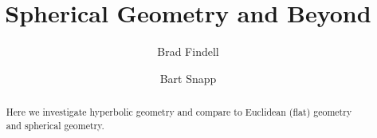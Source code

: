 \documentclass{ximera}
\title{Spherical Geometry and Beyond}
\author{Brad Findell \and Bart Snapp}
\begin{document}
\begin{abstract}
Here we investigate hyperbolic geometry and compare to Euclidean (flat) geometry and spherical geometry.   
\end{abstract}
\maketitle


\end{document}
